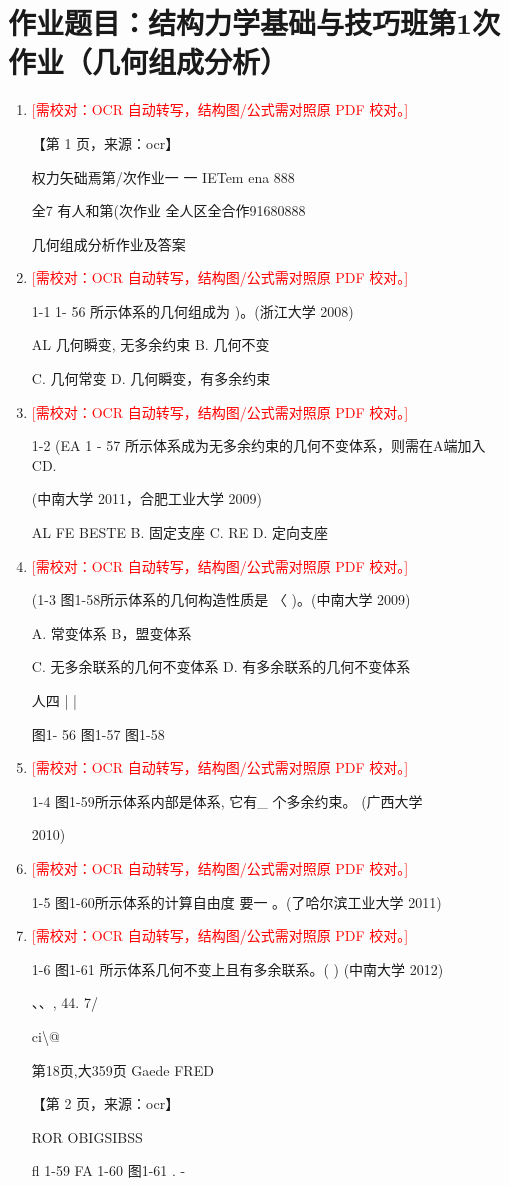 \documentclass[UTF8,12pt,a4paper,openany]{ctexbook}
\newcommand{\TODO}[1]{\textcolor{red}{[需校对：#1]}}
\begin{document}
\section{作业题目：结构力学基础与技巧班第1次作业（几何组成分析）}
\begin{enumerate}[label=\textbf{\arabic*.},leftmargin=2em]
\item \TODO{OCR 自动转写，结构图/公式需对照原 PDF 校对。}\par 【第 1 页，来源：ocr】\par 权力矢础焉第/次作业一 一 IETem ena      888\par 全7 有人和第(次作业 全人区全合作91680888\par 几何组成分析作业及答案
\item \TODO{OCR 自动转写，结构图/公式需对照原 PDF 校对。}\par 1-1 1- 56 所示体系的几何组成为  )。(浙江大学 2008)\par AL 几何瞬变, 无多余约束             B. 几何不变\par C. 几何常变                   D. 几何瞬变，有多余约束
\item \TODO{OCR 自动转写，结构图/公式需对照原 PDF 校对。}\par 1-2 (EA 1 - 57 所示体系成为无多余约束的几何不变体系，则需在A端加入 CD.\par (中南大学 2011，合肥工业大学 2009)\par AL FE BESTE   B. 固定支座     C. RE    D. 定向支座
\item \TODO{OCR 自动转写，结构图/公式需对照原 PDF 校对。}\par (1-3 图1-58所示体系的几何构造性质是 〈  )。(中南大学 2009)\par A. 常变体系                   B，盟变体系\par C. 无多余联系的几何不变体系       D. 有多余联系的几何不变体系\par 人四 | |\par 图1- 56               图1-57              图1-58
\item \TODO{OCR 自动转写，结构图/公式需对照原 PDF 校对。}\par 1-4 图1-59所示体系内部是体系, 它有\_ 个多余约束。 (广西大学\par 2010)
\item \TODO{OCR 自动转写，结构图/公式需对照原 PDF 校对。}\par 1-5 图1-60所示体系的计算自由度 要一       。(了哈尔滨工业大学 2011)
\item \TODO{OCR 自动转写，结构图/公式需对照原 PDF 校对。}\par 1-6 图1-61 所示体系几何不变上且有多余联系。(  ) (中南大学 2012)\par 、、, 44. 7/\par ci\textbackslash{}@\par 第18页,大359页                                 Gaede FRED\par \par 【第 2 页，来源：ocr】\par ROR OBIGSIBSS\par fl 1-59                FA 1-60               图1-61     .     -

\end{enumerate}
\end{document}
